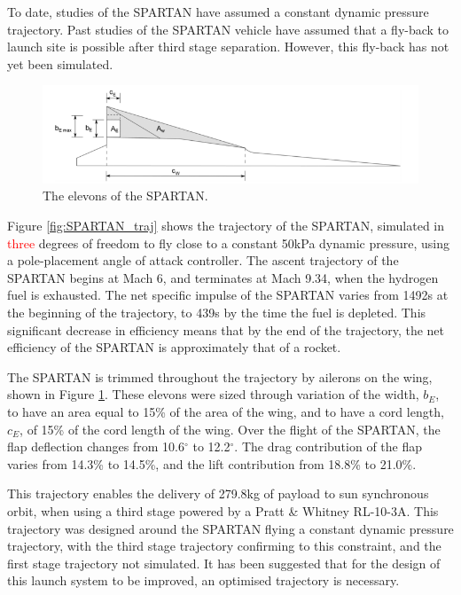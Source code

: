 To date, studies of the SPARTAN have assumed a constant dynamic pressure trajectory\cite{Preller2017b}.
Past studies of the SPARTAN vehicle have assumed that a fly-back to launch site is possible after third stage separation\cite{Preller2017b}. However, this fly-back has not yet been simulated. 
\begin{figure}[ht]
	\centering
	\includegraphics[width=0.7\linewidth]{figures/2_literature-review/SPARTANElevons}
	\caption{The elevons of the SPARTAN\cite{Preller2017b}.}
	\label{fig:SPARTANElevons}
\end{figure}

Figure \ref{fig:SPARTAN_traj} shows the trajectory of the SPARTAN, simulated in \textcolor{red}{three} degrees of freedom to fly close to a constant 50kPa dynamic pressure, using a pole-placement angle of attack controller\cite{Preller2017b}.
The ascent trajectory of the SPARTAN begins at Mach 6, and terminates at Mach 9.34, when the hydrogen fuel is exhausted\cite{Preller2017b}. 
The net specific impulse of the SPARTAN varies from 1492s at the beginning of the trajectory, to 439s by the time the fuel is depleted\cite{Preller2017b}. This significant decrease in efficiency means that by the end of the trajectory, the net efficiency of the SPARTAN is approximately that of a rocket\cite{Preller2017b}.

The SPARTAN is trimmed throughout the trajectory by ailerons on the wing, shown in Figure \ref{fig:SPARTANElevons}. These elevons were sized through variation of the width, $b_E$, to have an area equal to 15\% of the area of the wing, and to have a cord length, $c_E$, of 15\% of the cord length of the wing\cite{Preller2017b}. Over the flight of the SPARTAN, the flap deflection changes from 10.6$^\circ$ to 12.2$^\circ$\cite{Preller2017b}. The drag contribution of the flap varies from 14.3\% to 14.5\%, and the lift contribution from 18.8\% to 21.0\%\cite{Preller2018a}. 



 This trajectory enables the delivery of 279.8kg of payload to sun synchronous orbit, when using a third stage powered by a Pratt \& Whitney RL-10-3A\cite{Preller2018a}. 
This trajectory was designed around the SPARTAN flying a constant dynamic pressure trajectory, with the third stage trajectory confirming to this constraint, and the first stage trajectory not simulated. It has been suggested that for the design of this launch system to be improved, an optimised trajectory is necessary\cite{Preller2017b}.







